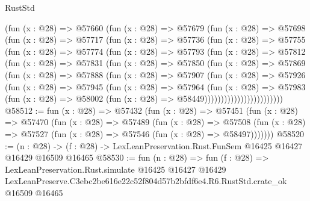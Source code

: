\begin{lexlean}{RustStd}
\begin{coremodule}
            (fun (x : @28) =>
            @57660
              (fun (x : @28) =>
              @57679
                (fun (x : @28) =>
                @57698
                  (fun (x : @28) =>
                  @57717
                    (fun (x : @28) =>
                    @57736
                      (fun (x : @28) =>
                      @57755
                        (fun (x : @28) =>
                        @57774
                          (fun (x : @28) =>
                          @57793
                            (fun (x : @28) =>
                            @57812
                              (fun (x : @28) =>
                              @57831
                                (fun (x : @28) =>
                                @57850
                                  (fun (x : @28) =>
                                  @57869
                                    (fun (x : @28) =>
                                    @57888
                                      (fun (x : @28) =>
                                      @57907
                                        (fun (x : @28) =>
                                        @57926
                                          (fun (x : @28) =>
                                          @57945
                                            (fun (x : @28) =>
                                            @57964
                                              (fun (x : @28) =>
                                              @57983
                                                (fun (x : @28) =>
                                                @58002
                                                  (fun (x : @28) => @58449))))))))))))))))))))))))
@58512 := fun (x : @28) =>
  @57432
    (fun (x : @28) =>
    @57451
      (fun (x : @28) =>
      @57470
        (fun (x : @28) =>
        @57489
          (fun (x : @28) =>
          @57508 (fun (x : @28) => @57527 (fun (x : @28) => @57546 (fun (x : @28) => @58497)))))))
@58520 := (n : @28) ->
  (f : @28) -> LexLeanPreservation.Rust.FunSem @16425 @16427 @16429 @16509 @16465
@58530 := fun (n : @28) =>
  fun (f : @28) =>
  LexLeanPreservation.Rust.simulate
    @16425
    @16427
    @16429
    LexLeanPreserve.C3ebc2be616e22c52f804d57b2bfdf6e4.R6.RustStd.crate_ok
    @16509
    @16465
\end{coremodule}
\end{lexlean}
